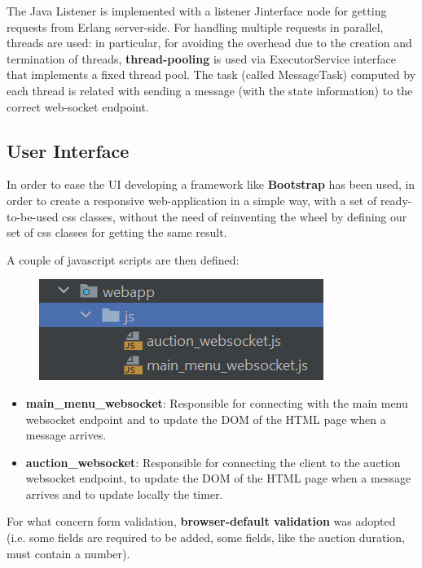 The Java Listener is implemented with a listener Jinterface node for getting requests from Erlang server-side. For handling multiple requests in parallel, threads are used: in particular, for avoiding the overhead due to the creation and termination of threads, \textbf{thread-pooling} is used via ExecutorService interface that implements a fixed thread pool. The task (called MessageTask) computed by each thread is related with sending a message (with the state information) to the correct web-socket endpoint.

\subsection{User Interface} 
In order to ease the UI developing a framework like \textbf{Bootstrap} has been used, in order to create a responsive web-application in a simple way, with a set of ready-to-be-used css classes, without the need of reinventing the wheel by defining our set of css classes for getting the same result. 


A couple of javascript scripts are then defined:

\begin{figure}[H]
	\centering
	\includegraphics[width=0.4\linewidth]{img/js}
	\caption{}
	\label{fig:js}
\end{figure}

\begin{itemize}
	\item \textbf{main\_menu\_websocket}: Responsible for connecting with the main menu websocket endpoint and to update the DOM of the HTML page when a message arrives.
	\item \textbf{auction\_websocket}: Responsible for connecting the client to the auction websocket endpoint, to update the DOM of the HTML page when a message arrives and to update locally the timer.
\end{itemize}

For what concern form validation, \textbf{browser-default validation} was adopted (i.e. some fields are required to be added, some fields, like the auction duration,  must contain a number).
